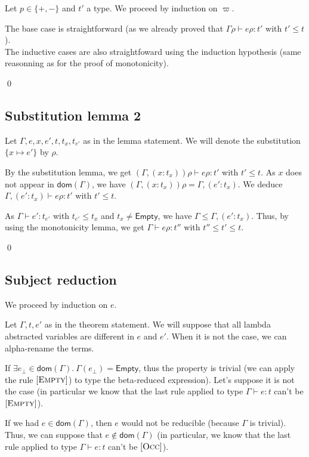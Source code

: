 \documentclass[a4paper]{article}%
\newcommand{\dom}[1]{\textsf{dom}(#1)}
\newcommand{\Empty} {\textsf{Empty}}%
\newcommand{\subst}[2]{\{#1 \mapsto #2\}}
\theoremstyle{definition}
\newcommand {\Rule}[1] {[\textsc{#1}]}
\begin{document}
    Let $p\in \{+,-\}$ and $t'$ a type.
    We proceed by induction on $\varpi$.

    The base case is straightforward (as we already proved that $\Gamma \rho \vdash e \rho:t'$ with $t'\leq t$).\\
    The inductive cases are also straightfoward using the induction hypothesis (same reasonning as for the proof of monotonicity).

    \qed

    \subsection{Substitution lemma 2}

    Let $\Gamma,e,x,e',t,t_x,t_{e'}$ as in the lemma statement.
    We will denote the substitution $\subst x {e'}$ by $\rho$.

    By the substitution lemma, we get $(\Gamma, (x:t_x))\rho \vdash e\rho:t'$ with $t' \leq t$.
    As $x$ does not appear in $\dom \Gamma$, we have $(\Gamma, (x:t_x))\rho = \Gamma, (e':t_x)$.
    We deduce $\Gamma, (e':t_x) \vdash e\rho:t'$ with $t' \leq t$.

    As $\Gamma \vdash e':t_{e'}$ with $t_{e'} \leq t_x$ and $t_x \neq \Empty$, we have $\Gamma \leq \Gamma, (e':t_x)$.
    Thus, by using the monotonicity lemma, we get $\Gamma\vdash e\rho:t''$ with $t'' \leq t' \leq t$.

    \qed

    \subsection{Subject reduction}

    We proceed by induction on $e$.

    Let $\Gamma,t,e'$ as in the theorem statement.
    We will suppose that all lambda abstracted variables are different in $e$ and $e'$. When it is not the case, we can alpha-rename the terms.

    If $\exists e_{\bot} \in \dom\Gamma.\ \Gamma(e_{\bot}) = \Empty$, thus the property is trivial
    (we can apply the rule $\Rule {Empty}$) to type the beta-reduced expression).
    Let's suppose it is not the case (in particular we know that the last rule applied to type $\Gamma \vdash e:t$ can't be $\Rule{Empty}$).

    If we had $e\in\dom\Gamma$, then $e$ would not be reducible (because $\Gamma$ is trivial).
    Thus, we can suppose that $e\not\in\dom\Gamma$ (in particular, we know that the last rule applied to type $\Gamma \vdash e:t$ can't be $\Rule{Occ}$).
\end{document}
